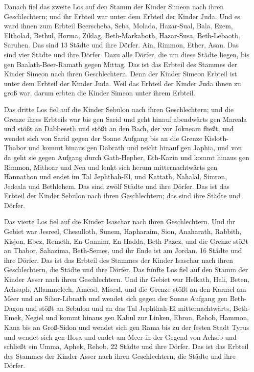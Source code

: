  Danach fiel das zweite Los auf den Stamm der Kinder
Simeon nach ihren Geschlechtern; und ihr Erbteil war unter dem Erbteil
der Kinder Juda.  Und es ward ihnen zum Erbteil
Beerscheba, Seba, Molada,  Hazar-Sual, Bala, Ezem,
 Eltholad, Bethul, Horma,  Ziklag,
Beth-Markaboth, Hazar-Susa,  Beth-Lebaoth, Saruhen. Das
sind 13 Städte und ihre Dörfer.  Ain, Rimmon, Ether, Asan.
Das sind vier Städte und ihre Dörfer.  Dazu alle Dörfer,
die um diese Städte liegen, bis gen Baalath-Beer-Ramath gegen Mittag.
Das ist das Erbteil des Stammes der Kinder Simeon nach ihren
Geschlechtern.  Denn der Kinder Simeon Erbteil ist unter
dem Erbteil der Kinder Juda. Weil das Erbteil der Kinder Juda ihnen zu
groß war, darum erbten die Kinder Simeon unter ihrem Erbteil.

 Das dritte Los fiel auf die Kinder Sebulon nach ihren
Geschlechtern; und die Grenze ihres Erbteils war bis gen Sarid
 und geht hinauf abendwärts gen Mareala und stößt an
Dabbeseth und stößt an den Bach, der vor Jokneam fließt, 
und wendet sich von Sarid gegen der Sonne Aufgang bis an die Grenze
Kisloth-Thabor und kommt hinaus gen Dabrath und reicht hinauf gen
Japhia,  und von da geht sie gegen Aufgang durch
Gath-Hepher, Eth-Kazin und kommt hinaus gen Rimmon, Mithoar und Nea
 und lenkt sich herum mitternachtwärts gen Hannathon und
endet im Tal Jephthah-El,  und Kattath, Nahalal, Simron,
Jedeala und Bethlehem. Das sind zwölf Städte und ihre Dörfer.
 Das ist das Erbteil der Kinder Sebulon nach ihren
Geschlechtern; das sind ihre Städte und Dörfer.

 Das vierte Los fiel auf die Kinder Isaschar nach ihren
Geschlechtern.  Und ihr Gebiet war Jesreel, Chesulloth,
Sunem,  Hapharaim, Sion, Anaharath, 
Rabbith, Kisjon, Ebez,  Remeth, En-Gannim, En-Hadda,
Beth-Pazez,  und die Grenze stößt an Thabor, Sahazima,
Beth-Semes, und ihr Ende ist am Jordan. 16 Städte und ihre Dörfer.
 Das ist das Erbteil des Stammes der Kinder Isaschar nach
ihren Geschlechtern, die Städte und ihre Dörfer.  Das
fünfte Los fiel auf den Stamm der Kinder Asser nach ihren Geschlechtern.
 Und ihr Gebiet war Helkath, Hali, Beten, Achsaph,
 Allammelech, Amead, Miseal, und die Grenze stößt an den
Karmel am Meer und an Sihor-Libnath  und wendet sich
gegen der Sonne Aufgang gen Beth-Dagon und stößt an Sebulon und an das
Tal Jephthah-El mitternachtwärts, Beth-Emek, Negiel und kommt hinaus gen
Kabul zur Linken,  Ebron, Rehob, Hammon, Kana bis an
Groß-Sidon  und wendet sich gen Rama bis zu der festen
Stadt Tyrus und wendet sich gen Hosa und endet am Meer in der Gegend von
Achsib  und schließt ein Umma, Aphek, Rehob. 22 Städte
und ihre Dörfer.  Das ist das Erbteil des Stammes der
Kinder Asser nach ihren Geschlechtern, die Städte und ihre Dörfer.

